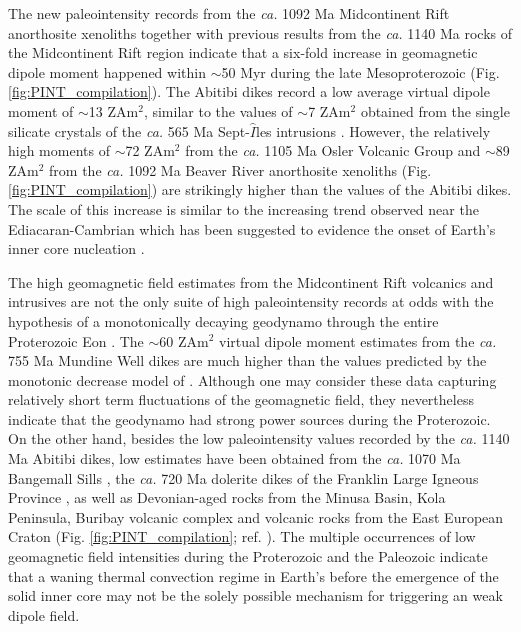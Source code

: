 \documentclass[9pt,twocolumn,twoside,lineno]{pnas-new}
\begin{document}
The new paleointensity records from the \textit{ca.} 1092 Ma Midcontinent Rift anorthosite xenoliths together with previous results from the \textit{ca.} 1140 Ma rocks of the Midcontinent Rift region indicate that a six-fold increase in geomagnetic dipole moment happened within $\sim$50 Myr during the late Mesoproterozoic (Fig. \ref{fig:PINT_compilation}). The Abitibi dikes \cite{Macouin2003a} record a low average virtual dipole moment of $\sim$13 ZAm$^2$, similar to the values of $\sim$7 ZAm$^2$ obtained from the single silicate crystals of the \textit{ca.} 565 Ma Sept-$\hat{I}$les intrusions \cite{Bono2019a}. However, the relatively high moments of $\sim$72 ZAm$^2$ from the \textit{ca.} 1105 Ma Osler Volcanic Group \cite{Sprain2018a} and $\sim$89 ZAm$^2$ from the \textit{ca.} 1092 Ma Beaver River anorthosite xenoliths (Fig. \ref{fig:PINT_compilation}) are strikingly higher than the values of the Abitibi dikes. The scale of this increase is similar to the increasing trend observed near the Ediacaran-Cambrian which has been suggested to evidence the onset of Earth's inner core nucleation \cite{Thallner2021a}. 

The high geomagnetic field estimates from the Midcontinent Rift volcanics and intrusives are not the only suite of high paleointensity records at odds with the hypothesis of a monotonically decaying geodynamo through the entire Proterozoic Eon \cite{Biggin2009a, Bono2019a}. The $\sim$60 ZAm$^2$ virtual dipole moment estimates from the \textit{ca.} 755 Ma Mundine Well dikes are much higher than the values predicted by the monotonic decrease model of \cite{Bono2019a}. Although one may consider these data capturing relatively short term fluctuations of the geomagnetic field, they nevertheless indicate that the geodynamo had strong power sources during the Proterozoic. On the other hand, besides the low paleointensity values recorded by the \textit{ca.} 1140 Ma Abitibi dikes, low estimates have been obtained from the \textit{ca.} 1070 Ma Bangemall Sills \cite{Lloyd2021b}, the \textit{ca.} 720 Ma dolerite dikes of the Franklin Large Igneous Province \cite{Lloyd2021a}, as well as Devonian-aged rocks from the Minusa Basin, Kola Peninsula, Buribay volcanic complex and volcanic rocks from the East European Craton (Fig. \ref{fig:PINT_compilation}; ref. \citealp{Shcherbakova2017a, Shcherbakova2019a, Shcherbakova2021a}). The multiple occurrences of low geomagnetic field intensities during the Proterozoic and the Paleozoic indicate that a waning thermal convection regime in Earth's before the emergence of the solid inner core may not be the solely possible mechanism for triggering an weak dipole field. 
\end{document}
